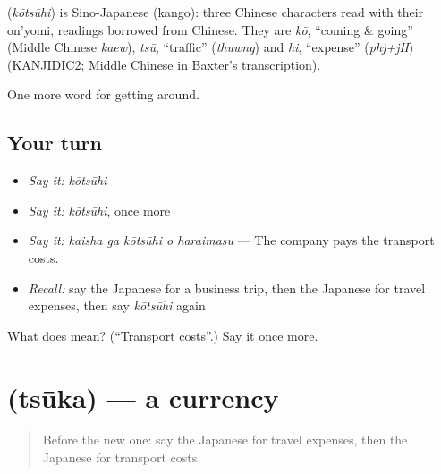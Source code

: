 \begin{cousinweb}
\textbf{} (\emph{kōtsūhi}) is Sino-Japanese (kango): three Chinese characters read with their on'yomi, readings borrowed from Chinese. They are \emph{kō}, \textquotedblleft{}coming \& going\textquotedblright{} (Middle Chinese \emph{kaew}), \emph{tsū}, \textquotedblleft{}traffic\textquotedblright{} (\emph{thuwng}) and \emph{hi}, \textquotedblleft{}expense\textquotedblright{} (\emph{phj+jH}) (KANJIDIC2; Middle Chinese in Baxter's transcription).
\end{cousinweb}

\begin{grammarlens}[title={What you've built}]
One more word for getting around.
\end{grammarlens}

\subsection*{Your turn}
\begin{itemize}
\raggedright
  \item \emph{Say it:} \emph{kōtsūhi}
  \item \emph{Say it:} \emph{kōtsūhi}, once more
  \item \emph{Say it:} \emph{kaisha ga kōtsūhi o haraimasu} — The company pays the transport costs.
  \item \emph{Recall:} say the Japanese for a business trip, then the Japanese for travel expenses, then say \emph{kōtsūhi} again
\end{itemize}

\begin{tcolorbox}[breakable,colback=teal!4,colframe=teal!35!black,title={Before you move on}]
What does  mean? (\textquotedblleft{}Transport costs\textquotedblright{}.) Say it once more.
\end{tcolorbox}
\section[\texorpdfstring{\ja{つうか} (tsūka)}{つうか (tsūka)}]{ (tsūka) — a currency}

\label{lesson:JA-C388-tsuuka}



\begin{quote}
Before the new one: say the Japanese for travel expenses, then the Japanese for transport costs.
\end{quote}

